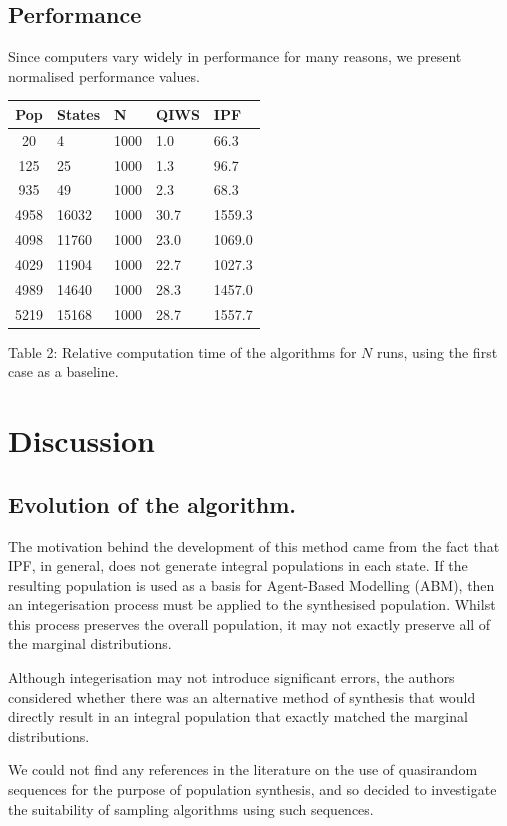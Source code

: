 \documentclass[]{article}
\begin{document}
\subsection{Performance}\label{performance}

Since computers vary widely in performance for many reasons, we present
normalised performance values.

\begin{longtable}[]{@{}cllll@{}}
\toprule
Pop & States & N & QIWS & IPF\tabularnewline
\midrule
\endhead
20 & 4 & 1000 & 1.0 & 66.3\tabularnewline
125 & 25 & 1000 & 1.3 & 96.7\tabularnewline
935 & 49 & 1000 & 2.3 & 68.3\tabularnewline
4958 & 16032 & 1000 & 30.7 & 1559.3\tabularnewline
4098 & 11760 & 1000 & 23.0 & 1069.0\tabularnewline
4029 & 11904 & 1000 & 22.7 & 1027.3\tabularnewline
4989 & 14640 & 1000 & 28.3 & 1457.0\tabularnewline
5219 & 15168 & 1000 & 28.7 & 1557.7\tabularnewline
\bottomrule
\end{longtable}

\begin{center}
Table 2: Relative computation time of the algorithms for \(N\) runs, using the first
case as a baseline.
\end{center}

\section{Discussion}\label{discussion}

\subsection{Evolution of the
algorithm.}\label{evolution-of-the-algorithm.}

The motivation behind the development of this method came from the fact
that IPF, in general, does not generate integral populations in each
state. If the resulting population is used as a basis for Agent-Based
Modelling (ABM), then an integerisation process must be applied to the
synthesised population. Whilst this process preserves the overall
population, it may not exactly preserve all of the marginal
distributions.

Although integerisation may not introduce significant errors, the
authors considered whether there was an alternative method of synthesis
that would directly result in an integral population that exactly
matched the marginal distributions.

We could not find any references in the literature on the use of
quasirandom sequences for the purpose of population synthesis, and so
decided to investigate the suitability of sampling algorithms using such
sequences.
\end{document}

